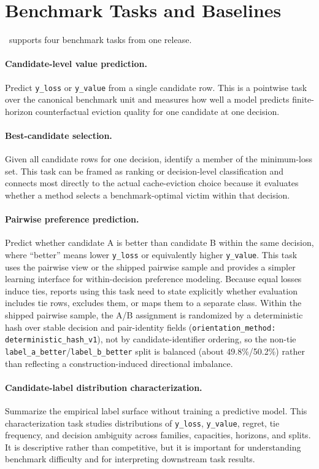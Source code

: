 \section{Benchmark Tasks and Baselines}
\label{sec:tasks-baselines}

\lafc\ supports four benchmark tasks from one release.

\paragraph{Candidate-level value prediction.}
Predict \texttt{y\_loss} or \texttt{y\_value} from a single candidate row. This is a pointwise task over the canonical benchmark unit and measures how well a model predicts finite-horizon counterfactual eviction quality for one candidate at one decision.

\paragraph{Best-candidate selection.}
Given all candidate rows for one decision, identify a member of the minimum-loss set. This task can be framed as ranking or decision-level classification and connects most directly to the actual cache-eviction choice because it evaluates whether a method selects a benchmark-optimal victim within that decision.

\paragraph{Pairwise preference prediction.}
Predict whether candidate A is better than candidate B within the same decision, where ``better'' means lower \texttt{y\_loss} or equivalently higher \texttt{y\_value}. This task uses the pairwise view or the shipped pairwise sample and provides a simpler learning interface for within-decision preference modeling. Because equal losses induce ties, reports using this task need to state explicitly whether evaluation includes tie rows, excludes them, or maps them to a separate class. Within the shipped pairwise sample, the A/B assignment is randomized by a deterministic hash over stable decision and pair-identity fields (\texttt{orientation\_method: deterministic\_hash\_v1}), not by candidate-identifier ordering, so the non-tie \texttt{label\_a\_better}/\texttt{label\_b\_better} split is balanced (about 49.8\%/50.2\%) rather than reflecting a construction-induced directional imbalance.

\paragraph{Candidate-label distribution characterization.}
Summarize the empirical label surface without training a predictive model. This characterization task studies distributions of \texttt{y\_loss}, \texttt{y\_value}, regret, tie frequency, and decision ambiguity across families, capacities, horizons, and splits. It is descriptive rather than competitive, but it is important for understanding benchmark difficulty and for interpreting downstream task results.


